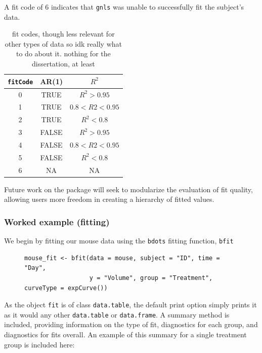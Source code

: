 \documentclass{article}
\newcommand{\xt}{\texttt}%
\begin{document}
A fit code of 6 indicates that \xt{gnls} was unable to successfully fit the subject's data. 

\begin{table}[h]
\centering
\def\arraystretch{1.5}
\begin{tabular}{|c|c|c|}
\hline
\xt{fitCode} & AR(1) & $R^2$ \\
\hline
0 & TRUE & $R^2 > 0.95$ \\
1 & TRUE & $0.8 < R2 < 0.95$ \\
2 & TRUE & $ R^2 <0.8$ \\
3 & FALSE & $R^2 >0.95$ \\
4 & FALSE & $0.8 < R2 < 0.95$ \\
5 & FALSE &$ R^2 <0.8$  \\
6 & NA & NA \\
\hline
\end{tabular}
\caption{fit codes, though less relevant for other types of data so idk really what to do about it. nothing for the dissertation, at least}
\label{tab:fit_codes}
\end{table}

Future work on the package will seek to modularize the evaluation of fit quality, allowing users more freedom in creating a hierarchy of fitted values. 


\subsubsection{Worked example (fitting)} 

We begin by fitting our mouse data using the \xt{bdots} fitting function, \xt{bfit}

\begin{singlespace}
\begin{figure}[H]
\centering
\begin{BVerbatim}
mouse_fit <- bfit(data = mouse, subject = "ID", time = "Day", 
                  y = "Volume", group = "Treatment", curveType = expCurve())
\end{BVerbatim}
\end{figure}
\end{singlespace}



As the object \xt{fit} is of class \xt{data.table}, the default print option simply prints it as it would any other \xt{data.table} or \xt{data.frame}. A summary method is included, providing information on the type of fit, diagnostics for each group, and diagnostics for fits overall. An example of this summary for a single treatment group is included here:
\end{document}
